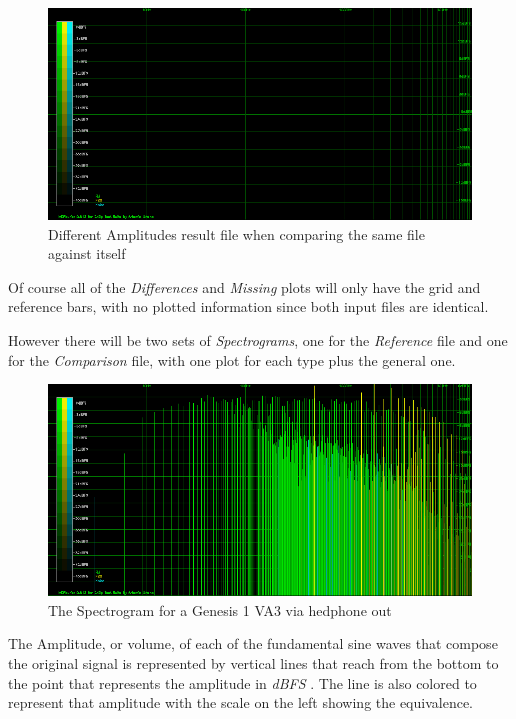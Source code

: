 \documentclass[10pt,a4paper]{report}
\begin{document}
\begin{figure}[H]
	\centering
	\includegraphics[width=1.0\linewidth]{plots/Plot1-SameFile.png}
	\caption[Same file compared]{Different Amplitudes result file when comparing the same file against itself}
	\label{fig:plot1-samefile}
\end{figure}

Of course all of the \textit{Differences} and \textit{Missing} plots will only have the grid and reference bars, with no plotted information since both input files are identical. 

However there will be two sets of \textit{Spectrograms}, one for the \textit{Reference} file and one for the \textit{Comparison} file, with one plot for each type plus the general one.

\begin{figure}[H]
	\centering
	\includegraphics[width=1.0\linewidth]{plots/Plot2-SameFile-FM-Spectrogram.png}
	\caption[Spectrogram]{The Spectrogram for a Genesis 1 VA3 via hedphone out}
	\label{fig:plot2-samefile-fm-spectrogram}
\end{figure}

The Amplitude, or volume, of each of the fundamental sine waves that compose the original signal is represented by vertical lines that reach from the bottom to the point that represents the amplitude in \textit{dBFS} \cite{dbfs}. The line is also colored to represent that amplitude with the scale on the left showing the equivalence.
\end{document}
